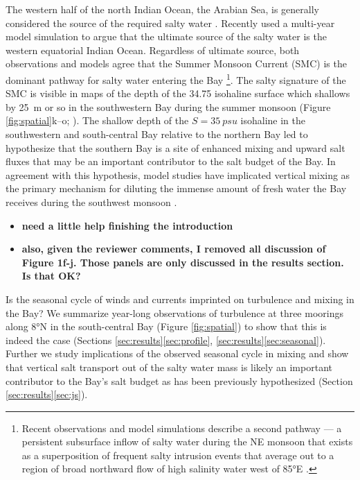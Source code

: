 \documentclass[twocol]{ametsoc}
\begin{document}
The western half of the north Indian Ocean, the Arabian Sea, is generally considered the source of the required salty water \citep[for example, ][]{Jensen2001}.
Recently \cite{Sanchez-Franks2019} used a multi-year model simulation to argue that the ultimate source of the salty water is the western equatorial Indian Ocean.
Regardless of ultimate source, both observations and models agree that the Summer Monsoon Current (SMC) is the dominant pathway for salty water entering the Bay \citep{Jensen2001,Vinayachandran2013,Webber2018}\footnote{Recent observations and model simulations describe a second pathway — a persistent subsurface inflow of salty water during the NE monsoon that exists as a superposition of frequent salty intrusion events that average out to a region of broad northward flow of high salinity water west of 85°E \citep{Wijesekera2015,Jensen2016}.}.
The salty signature of the SMC is visible in maps of the depth of the 34.75 isohaline surface which shallows by \SI{25}{m} or so in the southwestern Bay during the summer monsoon (Figure \ref{fig:spatial}k--o; \citealp{Murty1992a,Vinayachandran2013}).
The shallow depth of the \(S = \SI{35}{psu}\) isohaline in the southwestern and south-central Bay relative to the northern Bay led \cite{Vinayachandran2013} to hypothesize that the southern Bay is a site of enhanced mixing and upward salt fluxes that may be an important contributor to the salt budget of the Bay.
In agreement with this hypothesis, model studies have implicated vertical mixing as the primary mechanism for diluting the immense amount of fresh water the Bay receives during the southwest monsoon \citep{Akhil2014,Benshila2014,Wilson2016a}.

\begin{itemize}
\item \textbf{need a little help finishing the introduction}
\item \textbf{also, given the reviewer comments, I removed all discussion of Figure 1f-j. Those panels are only discussed in the results section. Is that OK?}
\end{itemize}
Is the seasonal cycle of winds and currents imprinted on turbulence and mixing in the Bay?
We summarize year-long observations of turbulence at three moorings along 8°N in the south-central Bay (Figure \ref{fig:spatial}) to show that this is indeed the case (Sections \ref{sec:results}\ref{sec:profile}, \ref{sec:results}\ref{sec:seasonal}).
Further we study implications of the observed seasonal cycle in mixing and show that vertical salt transport out of the salty water mass is likely an important contributor to the Bay's salt budget as has been previously hypothesized (Section \ref{sec:results}\ref{sec:js}).
\end{document}
